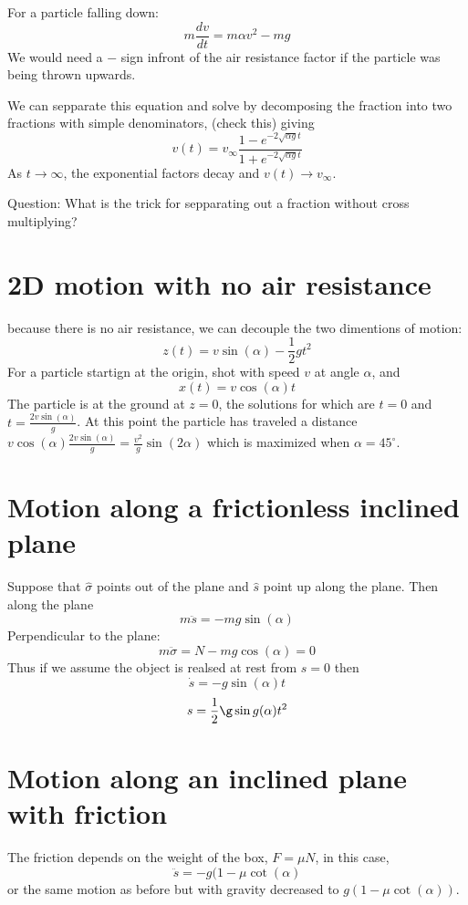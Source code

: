 \documentclass{homework}
\begin{document}
For a particle falling down:
\[m\frac{dv}{dt} = m\alpha v^2 - mg\]
We would need a $-$ sign infront of the air resistance factor if the particle was being thrown upwards.

We can sepparate this equation and solve by  decomposing the fraction into two fractions with simple denominators, (check this) giving
\[v(t) = v_{\infty} \frac{1 - e^{-2\sqrt{\alpha g }t}}{1 + e^{-2\sqrt{\alpha g }t}}\]
As $t \rightarrow \infty$, the exponential factors decay and $v(t) \rightarrow v_{\infty}$.

Question: What is the trick for sepparating out a fraction without cross multiplying?


\section{2D motion with no air resistance}

because there is no air resistance, we can decouple the two dimentions of motion:
\[z(t) = v\sin(\alpha)-\frac{1}{2}gt^2\]
For a particle startign at the origin, shot with speed $v$ at angle $\alpha$, and 
\[x(t) = v\cos (\alpha)t\]
The particle is at the ground at $z = 0$, the solutions for which are $t = 0$ and $t = \frac{2v\sin (\alpha )}{g}$. At this point the particle has traveled a distance $v\cos (\alpha ) \frac{2v\sin (\alpha )}{g} = \frac{v^2}{g}\sin (2 \alpha )$ which is maximized when $\alpha = 45^{\circ}$.

\section{Motion along a frictionless inclined plane}

Suppose that $\hat\sigma$ points out of the plane and $\hat s$ point up along the plane. Then along the plane
\[m\ddot s = -mg\sin (\alpha)\]
Perpendicular to the plane:
\[m \ddot {\sigma} = N - mg \cos (\alpha) =0\]
Thus if we assume the object is realsed at rest from $s = 0$ then
\[\dot s = -g \sin (\alpha) t\]
\[s = \frac{1}{2}\g \sin g (\alpha)t^2\]

\section{Motion along an inclined plane with friction}

The friction depends on the weight of the box, $F = \mu N$, in this case,
\[\ddot s = -g(1 - \mu \cot (\alpha)\]
or the same motion as before but with gravity decreased to $g(1 - \mu \cot (\alpha))$.
\end{document}
